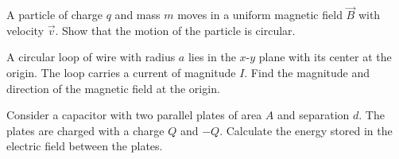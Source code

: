 \documentclass[12pt]{exam}
\begin{document}
\begin{questions}

\question[10] A particle of charge $q$ and mass $m$ moves in a uniform magnetic field $\vec{B}$ with velocity $\vec{v}$. Show that the motion of the particle is circular.

\vspace{8cm}

\question[10] A circular loop of wire with radius $a$ lies in the $x$-$y$ plane with its center at the origin. The loop carries a current of magnitude $I$. Find the magnitude and direction of the magnetic field at the origin.

\vspace{8cm}

\question[10] Consider a capacitor with two parallel plates of area $A$ and separation $d$. The plates are charged with a charge $Q$ and $-Q$. Calculate the energy stored in the electric field between the plates.

\vspace{8cm}

\end{questions}
\end{document}
